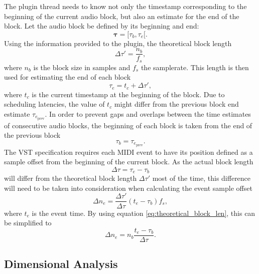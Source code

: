 The plugin thread needs to know not only
the timestamp corresponding to the beginning of the current audio block,
but also an estimate for the end of the block.
Let the audio block be defined by its beginning and end:
\begin{equation}
\boldsymbol{\tau} = [\tau_b, \tau_e[.
\end{equation}
Using the information provided to the plugin,
the theoretical block length
\begin{equation}
\label{eq:theoretical_block_len}
\Delta \tau' = \frac{n_b}{f_s},
\end{equation}
where $n_b$ is the block size in samples and $f_s$ the samplerate.
This length is then used for estimating the end of each block
\begin{equation}
\tau_e = t_c + \Delta \tau',
\end{equation}
where $t_c$ is the current timestamp at the beginning of the block.
Due to scheduling latencies,
the value of $t_c$ might differ from the
previous block end estimate $\tau_{e_{\mathrm{prev}}}$.
In order to prevent gaps and overlaps between the
time estimates of consecutive audio blocks,
the beginning of each block is taken from the end of the previous block
\begin{equation}
\tau_b = \tau_{e_{\mathrm{prev}}}.
\end{equation}
The VST specification requires
each MIDI event to have its position defined
as a sample offset from the beginning of the current block.
As the actual block length
\begin{equation}
\Delta \tau = \tau_e - \tau_b
\end{equation}
will differ from the theoretical block length
$\Delta \tau'$ most of the time,
this difference will need to be taken into consideration
when calculating the event sample offset
\begin{equation}
\Delta n_e = \frac{\Delta \tau'}{\Delta \tau} (t_e - \tau_b) f_s,
\end{equation}
where $t_e$ is the event time. By using equation \ref{eq:theoretical_block_len},
this can be simplified to
\begin{equation}
\Delta n_e = n_b \frac{t_e - \tau_b}{\Delta \tau}.
\end{equation}

\subsection{Dimensional Analysis}

